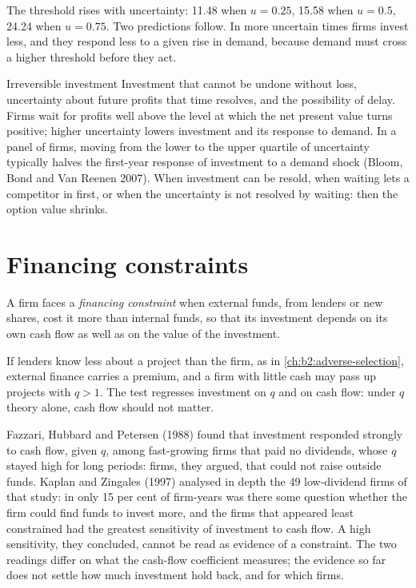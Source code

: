 The threshold rises with uncertainty: 11.48 when $u = 0.25$, 15.58 when $u = 0.5$, 24.24 when $u = 0.75$. Two predictions follow. In more uncertain times firms invest
less, and they respond less to a given rise in demand, because demand must cross a higher threshold before they act.

\begin{model}{Irreversible investment}
\assumes Investment that cannot be undone without loss, uncertainty about future profits that time resolves, and the
possibility of delay.
\predicts Firms wait for profits well above the level at which the net present value turns positive; higher uncertainty
lowers investment and its response to demand.
\tested In a panel of firms, moving from the lower to the upper quartile of uncertainty typically halves the first-year
response of investment to a demand shock (Bloom, Bond and Van Reenen 2007).
\breaks When investment can be resold, when waiting lets a competitor in first, or when the uncertainty is not resolved by
waiting: then the option value shrinks.
\end{model}

\section{Financing constraints}\label{sec:b2:investment:finance}

\begin{definition}\label{def:b2:investment:financing-constraint}
A firm faces a \emph{financing constraint} when external funds, from lenders or new shares,
cost it more than internal funds, so that its investment depends on its own cash flow as well as on the value of the
investment.
\end{definition}

If lenders know less about a project than the firm, as in \cref{ch:b2:adverse-selection}, external finance carries a premium, and a firm with
little cash may pass up projects with $q > 1$. The test regresses investment on $q$ and on cash flow: under $q$ theory alone, cash flow
should not matter.

\begin{debate}
Fazzari, Hubbard and Petersen (1988) found that investment responded strongly to cash flow, given $q$, among fast-growing firms
that paid no dividends, whose $q$ stayed high for long periods: firms, they argued, that could not raise outside funds.
Kaplan and Zingales (1997) analysed in depth the 49 low-dividend firms of that study: in only 15 per cent of
firm-years was there some question whether the firm could find funds to invest more, and the firms that appeared least
constrained had the greatest sensitivity of investment to cash flow. A high sensitivity, they concluded, cannot be read as
evidence of a constraint. The two readings differ on what the cash-flow coefficient measures; the evidence so far does not
settle how much investment  hold back, and for which firms.
\end{debate}

